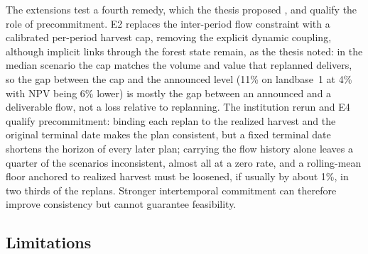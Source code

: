 The extensions test a fourth remedy, which the thesis proposed \citep[pp.~134--135]{daugherty1991credibility}, and qualify the role of precommitment. E2 replaces the inter-period flow constraint with a calibrated per-period harvest cap, removing the explicit dynamic coupling, although implicit links through the forest state remain, as the thesis noted: in the median scenario the cap matches the volume and value that replanned  delivers, so the gap between the cap and the announced  level (11\% on landbase~1 at 4\% with NPV being 6\% lower) is mostly the gap between an announced and a deliverable flow, not a loss relative to replanning. The institution rerun and E4 qualify precommitment: binding each replan to the realized harvest and the original terminal date makes the plan consistent, but a fixed terminal date shortens the horizon of every later plan; carrying the flow history alone leaves a quarter of the scenarios inconsistent, almost all at a zero rate, and a rolling-mean floor anchored to realized harvest must be loosened, if usually by about 1\%, in two thirds of the replans. Stronger intertemporal commitment can therefore improve consistency but cannot guarantee feasibility.

\hypertarget{limitations}{%
\subsection{Limitations}\label{limitations}}

